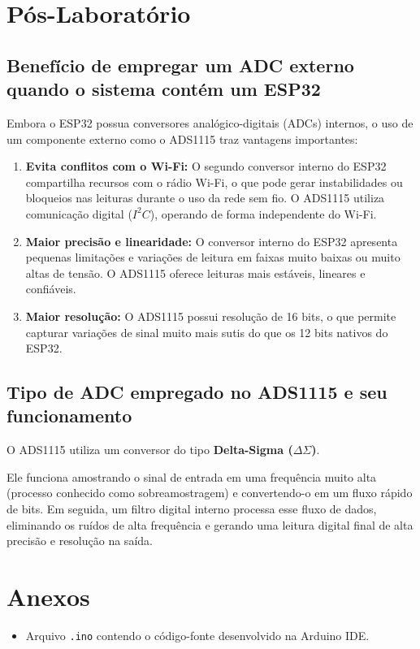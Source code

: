 \documentclass[a4paper,oneside,10pt]{article}
\begin{document}
\section{Pós-Laboratório}

\subsection{Benefício de empregar um ADC externo quando o sistema contém um ESP32}
Embora o ESP32 possua conversores analógico-digitais (ADCs) internos, o uso de um componente externo como o ADS1115 traz vantagens importantes:
\begin{enumerate}
    \item \textbf{Evita conflitos com o Wi-Fi:} O segundo conversor interno do ESP32 compartilha recursos com o rádio Wi-Fi, o que pode gerar instabilidades ou bloqueios nas leituras durante o uso da rede sem fio. O ADS1115 utiliza comunicação digital ($I^2C$), operando de forma independente do Wi-Fi.
    \item \textbf{Maior precisão e linearidade:} O conversor interno do ESP32 apresenta pequenas limitações e variações de leitura em faixas muito baixas ou muito altas de tensão. O ADS1115 oferece leituras mais estáveis, lineares e confiáveis.
    \item \textbf{Maior resolução:} O ADS1115 possui resolução de 16 bits, o que permite capturar variações de sinal muito mais sutis do que os 12 bits nativos do ESP32.
\end{enumerate}

\subsection{Tipo de ADC empregado no ADS1115 e seu funcionamento}
O ADS1115 utiliza um conversor do tipo \textbf{Delta-Sigma ($\Delta\Sigma$)}. 

Ele funciona amostrando o sinal de entrada em uma frequência muito alta (processo conhecido como sobreamostragem) e convertendo-o em um fluxo rápido de bits. Em seguida, um filtro digital interno processa esse fluxo de dados, eliminando os ruídos de alta frequência e gerando uma leitura digital final de alta precisão e resolução na saída.

\section{Anexos}
\begin{itemize}
    \item Arquivo \texttt{.ino} contendo o código-fonte desenvolvido na Arduino IDE.
\end{itemize}
\end{document}
